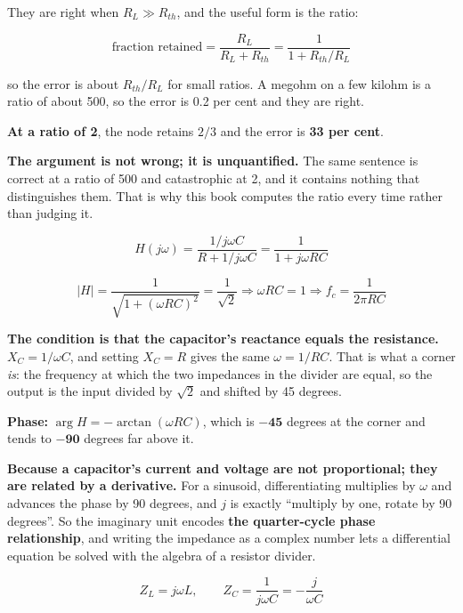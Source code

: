 They are right when $R_L \gg R_{th}$, and the useful form is the ratio:

\[
  \text{fraction retained} = \frac{R_L}{R_L + R_{th}} = \frac{1}{1 + R_{th}/R_L}
\]

so the error is about $R_{th}/R_L$ for small ratios. A megohm on a few kilohm is a ratio of about 500, so the error is 0.2 per cent and they are right.

\textbf{At a ratio of 2}, the node retains $2/3$ and the error is \textbf{33 per cent}.

\textbf{The argument is not wrong; it is unquantified.} The same sentence is correct at a ratio of 500 and catastrophic at 2, and it contains nothing that distinguishes them. That is why this book computes the ratio every time rather than judging it.



\[
  H(j\omega) = \frac{1/j\omega C}{R + 1/j\omega C} = \frac{1}{1 + j\omega RC}
\]

\[
  |H| = \frac{1}{\sqrt{1 + (\omega RC)^2}} = \frac{1}{\sqrt2}
  \Rightarrow \omega RC = 1 \Rightarrow \boxed{f_c = \frac{1}{2\pi RC}}
\]

\textbf{The condition is that the capacitor's reactance equals the resistance.} $X_C = 1/\omega C$, and setting $X_C = R$ gives the same $\omega = 1/RC$. That is what a corner \emph{is}: the frequency at which the two impedances in the divider are equal, so the output is the input divided by $\sqrt2$ and shifted by 45 degrees.

\textbf{Phase:} $\arg H = -\arctan(\omega RC)$, which is $\mathbf{-45}$ degrees at the corner and tends to $\mathbf{-90}$ degrees far above it.


\textbf{Because a capacitor's current and voltage are not proportional; they are related by a derivative.} For a sinusoid, differentiating multiplies by $\omega$ and advances the phase by 90 degrees, and $j$ is exactly ``multiply by one, rotate by 90 degrees''. So the imaginary unit encodes \textbf{the quarter-cycle phase relationship}, and writing the impedance as a complex number lets a differential equation be solved with the algebra of a resistor divider.

\[
  Z_L = j\omega L, \qquad Z_C = \frac{1}{j\omega C} = -\frac{j}{\omega C}
\]

